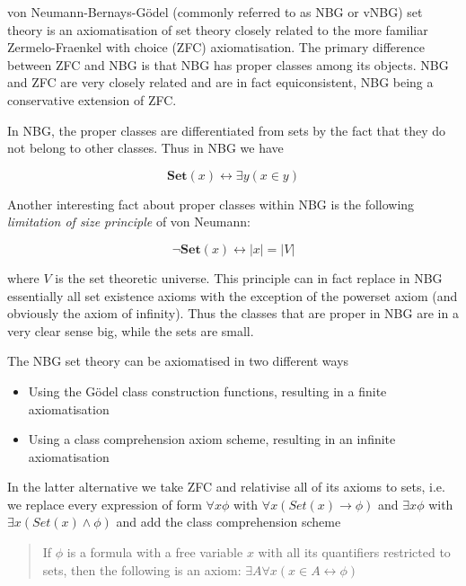 \documentclass[12pt]{article}
\begin{document}
von Neumann-Bernays-G\"odel (commonly referred to as NBG or vNBG) set theory is an axiomatisation of set theory closely related to the more familiar Zermelo-Fraenkel with choice (ZFC) axiomatisation. The primary difference between ZFC and NBG is that NBG has proper classes among its objects. NBG and ZFC are very closely related and are in fact equiconsistent, NBG being a conservative extension of ZFC.

In NBG, the proper classes are differentiated from sets by the fact that they do not belong to other classes. Thus in NBG we have

\begin{displaymath}
 \mathbf{Set}(x) \leftrightarrow \exists y ( x \in y )
\end{displaymath}

Another interesting fact about proper classes within NBG is the following {\em limitation of size principle} of von Neumann:

\begin{displaymath}
 \neg \mathbf{Set}(x) \leftrightarrow |x| = |V|
\end{displaymath}

where $V$ is the set theoretic universe. This principle can in fact replace in NBG essentially all set existence axioms with the exception of the powerset axiom (and obviously the axiom of infinity). Thus the classes that are proper in NBG are in a very clear sense big, while the sets are small.

The NBG set theory can be axiomatised in two different ways

\begin{itemize}
 \item Using the G\"odel class construction functions, resulting in a finite
       axiomatisation
 \item Using a class comprehension axiom scheme, resulting in an infinite 
       axiomatisation
\end{itemize}

In the latter alternative we take ZFC and relativise all of its axioms to sets, i.e. we replace every expression of form $\forall x \phi$ with $\forall x (Set(x) \rightarrow \phi)$ and $\exists x \phi$ with $\exists x (Set(x) \wedge \phi)$ and add the class comprehension scheme

\begin{quotation}
 If $\phi$ is a formula with a free variable $x$ with all its quantifiers
 restricted to sets, then the following is an
 axiom: $ \exists A \forall x (x \in A \leftrightarrow \phi)$
\end{quotation}
\end{document}
